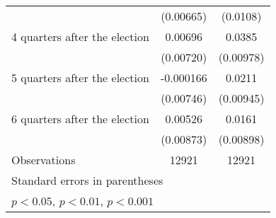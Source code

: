 \begin{table}[htbp]
\begin{tabular}{l*{2}{c}}
                    &   (0.00665)         &    (0.0108)         \\
[1em]
 4 quarters after the election&     0.00696         &      0.0385\sym{***}\\
                    &   (0.00720)         &   (0.00978)         \\
[1em]
 5 quarters after the election&   -0.000166         &      0.0211\sym{*}  \\
                    &   (0.00746)         &   (0.00945)         \\
[1em]
 6 quarters after the election&     0.00526         &      0.0161         \\
                    &   (0.00873)         &   (0.00898)         \\
\hline
Observations        &       12921         &       12921         \\
\hline\hline
\multicolumn{3}{l}{\footnotesize Standard errors in parentheses}\\
\multicolumn{3}{l}{\footnotesize \sym{*} \(p<0.05\), \sym{**} \(p<0.01\), \sym{***} \(p<0.001\)}\\
\end{tabular}
\end{table}
